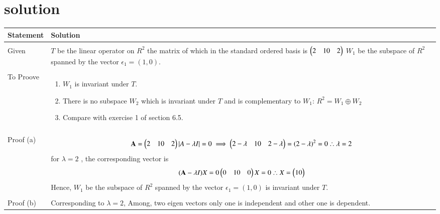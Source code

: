 \documentclass[journal,12pt,onecolumn]{IEEEtran}
\begin{document}
\section{solution}
\begin{longtable}{|p{5cm}|p{13cm}|}
\hline
\textbf{Statement} &\textbf{Solution}\\
\hline
& \\ 
Given
& \parbox{12cm}{$T$ be the linear operator on $R^2$
the matrix of which in the standard ordered basis is $\myvec{2&1\\0&2}$ \\
$W_1$ be the subspace of $R^2$ spanned by the vector $\epsilon_1=(1,0)$.\\}\\
\hline
& \\ 
To Proove
& \parbox{12cm}{\begin{enumerate}
\item {$W_1$ is invariant under $T$.}
\item{There is no subspace $W_2$ which is invariant under $T$ and is complementary to $W_1$:
$R^2=W_1\oplus W_2$}
\item{Compare with exercise 1 of section 6.5.}
\end{enumerate}}
\\
& \\
\hline
Proof (a) &
\parbox{12cm}{\begin{align}
    \vec{A}=\myvec{2&1\\0&2}\\
    \lvert A -\lambda I \rvert=0\\
      \implies \myvec{2-\lambda & 1\\0& 2- \lambda} \\
    = (2-\lambda)^2=0\\
    \therefore \lambda =2
    \end{align}
    for $\lambda = 2$ , the corresponding vector is
    \begin{align}
    (\vec{A}-\lambda I)X=0\\
    \myvec{0&1\\0&0}X=0\\
    \therefore X=\myvec{1\\0}
    \end{align}
    Hence, $W_1$ be the subspace of $R^2$ spanned by the vector $\epsilon_1=(1,0)$ is invariant under $T$.\\
}
\\
\hline
& \\
Proof (b) &
\parbox{12cm}{ Corresponding to $\lambda=2$, \\ Among, two eigen vectors only one is independent and other one is dependent.\\
}
\end{longtable}
\end{document}
